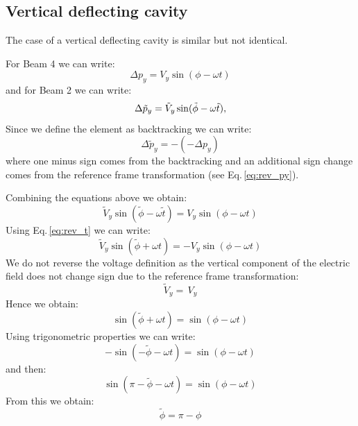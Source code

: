 \subsection{Vertical deflecting cavity}

The case of a vertical deflecting cavity is similar but not identical.

For Beam 4 we can write:
\begin{equation}
\Delta p_y = V_y \sin(\phi - \omega t)
\end{equation}
and for Beam 2 we can write:
\begin{equation}
\Delta\tilde{p}_y = \tilde{V}_y \sin(\tilde{\phi} - \omega \tilde{t}),\\[4pt]
\end{equation}
Since we define the element as backtracking we can write:
\begin{equation}
\Delta \tilde{p}_y = -(-\Delta p_y)
\end{equation}
where one minus sign comes from the backtracking and an additional sign change
comes from the reference frame transformation (see Eq.\,\ref{eq:rev_py}).

Combining the equations above we obtain:
\begin{equation}
\tilde{V}_y \sin(\tilde{\phi} - \omega \tilde{t}) = V_y \sin(\phi - \omega t)
\end{equation}
Using Eq.\,\ref{eq:rev_t} we can write:
\begin{equation}
\tilde{V}_y \sin(\tilde{\phi} + \omega t) = -V_y \sin(\phi - \omega t)
\end{equation}
We do not reverse the voltage definition as the vertical component of the electric
field does not change sign due to the reference frame transformation:
\begin{equation}
\boxed{
\tilde{V}_y = \,V_y
}
\end{equation}
Hence we obtain:
\begin{equation}
\sin(\tilde{\phi} + \omega t) = \sin(\phi - \omega t)
\end{equation}
Using trigonometric properties we can write:
\begin{equation}
-\sin(-\tilde{\phi} - \omega t) = \sin(\phi - \omega t)
\end{equation}
and then:
\begin{equation}
\sin(\pi - \tilde{\phi} - \omega t) = \sin(\phi - \omega t)
\end{equation}
From this we obtain:
\begin{equation}
\boxed{
\tilde{\phi} = \pi - \phi
}
\end{equation}







